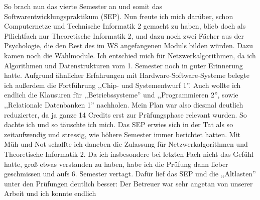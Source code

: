 \begin{multicols}{2}
So brach nun das vierte Semester an und somit das
Softwarentwicklungspraktikum (SEP). Nun freute ich mich darüber, schon
Computernetze und Technische Informatik 2 gemacht zu haben, blieb doch
als Pflichtfach nur Theoretische Informatik 2, und dazu noch zwei
Fächer aus der Psychologie, die den Rest des im WS angefangenen Moduls
bilden würden. Dazu kamen noch die Wahlmodule. Ich entschied
mich für Netzwerkalgorithmen, da ich Algorithmen und Datenstrukturen
vom 1. Semester noch in guter Erinnerung hatte. Aufgrund ähnlicher
Erfahrungen mit Hardware-Software-Systeme belegte ich außerdem die
Fortführung ,,Chip- und Systementwurf 1''.  Auch wollte ich endlich
die Klausuren für ,,Betriebssysteme'' und ,,Programmieren 2'', sowie
,,Relationale Datenbanken 1''
nachholen. 
Mein Plan war also diesmal deutlich reduzierter, da ja ganze 14 Credits
erst zur Prüfungsphase relevant wurden. So dachte ich und so täuschte
ich mich. Das SEP erwies sich in der Tat als so zeitaufwendig und
stressig, wie höhere Semester immer berichtet hatten. Mit Müh und Not
schaffte ich daneben die Zulassung für Netzwerkalgorithmen und
Theoretische Informatik 2. Da ich insbesondere bei letzten Fach nicht
das Gefühl hatte, groß etwas verstanden zu haben, habe ich die Prüfung
dann lieber geschmissen und aufs 6. Semester vertagt. Dafür lief das
SEP und die ,,Altlasten'' unter den Prüfungen deutlich besser: Der
Betreuer war sehr angetan von unserer Arbeit und ich konnte endlich

\end{multicols}
